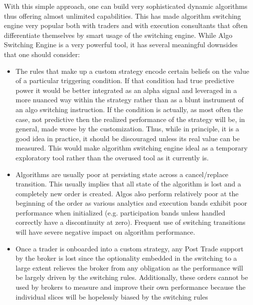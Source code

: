 With this simple approach, one can build very sophisticated dynamic algorithms thus offering almost unlimited capabilities. This has made algorithm switching engine very popular both with traders and with execution consultants that often differentiate themselves by smart usage of the switching engine. While Algo Switching Engine is a very powerful tool, it has several meaningful downsides that one should consider:


\begin{itemize}
\item The rules that make up a custom strategy encode certain beliefs on the value of a particular triggering condition. If that condition had true predictive power it would be better integrated as an alpha signal and leveraged in a more nuanced way within the strategy rather than as a blunt instrument of an algo switching instruction. If the condition is actually, as most often the case, not predictive then the realized performance of the strategy will be, in general, made worse by the customization. Thus, while in principle, it is a good idea in practice, it should be discouraged unless its real value can be measured. This would make algorithm switching engine ideal as a temporary exploratory tool rather than the overused tool as it currently is.



\pagebreak



\item  Algorithms are usually poor at persisting state across a cancel/replace transition. This usually implies that all state of the algorithm is lost and a completely new order is created. Algos also perform relatively poor at the beginning of the order as various analytics and execution bands exhibit poor performance when initialized (e.g. participation bands unless handled correctly have a discontinuity at zero). Frequent use of switching transitions will have severe negative impact on algorithm performance.

\item Once a trader is onboarded into a custom strategy, any Post Trade support by the broker is lost since the optionality embedded in the switching to a large extent relieves the broker from any obligation as the performance will be largely driven by the switching rules. Additionally, these orders cannot be used by brokers to measure and improve their own performance because the individual slices will be hopelessly biased by the switching rules
\end{itemize}


